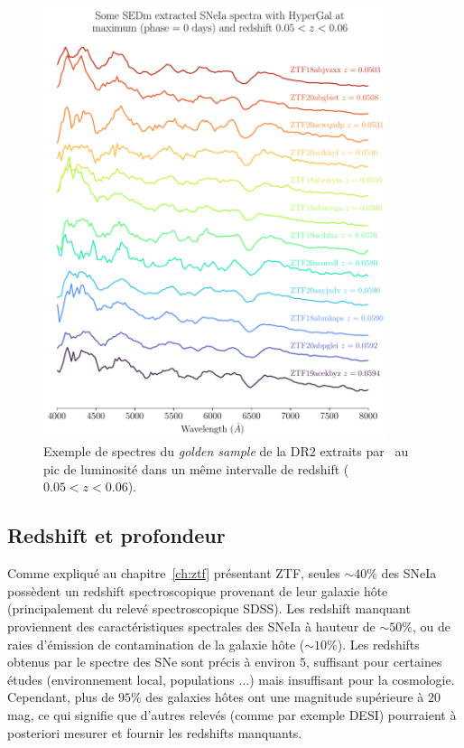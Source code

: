 \documentclass[../main/main.tex]{subfiles}
\begin{document}
\begin{figure}[ht]
  \centering
  \includegraphics[width=0.9\textwidth]{../figures/09_dr2/spec_example_hypergaldr2.pdf}
  \caption[Exemple de spectres du \textit{golden sample} de la DR2
  extraits par \hypergal.]{Exemple de spectres du \textit{golden sample} de la DR2
  extraits par \hypergal\ au pic de luminosité dans un même intervalle
  de redshift ($0.05<z<0.06$).}
  \label{fig:specexamplehypergal}
\end{figure}



\subsection{Redshift et profondeur}


Comme expliqué au chapitre~\ref{ch:ztf} présentant ZTF, seules
$\sim40\%$ des SNeIa possèdent un redshift spectroscopique provenant de
leur galaxie hôte (principalement du relevé spectroscopique SDSS). Les
redshift manquant proviennent des caractéristiques spectrales des SNeIa
à hauteur de $\sim50\%$, ou de raies d'émission de contamination de la
galaxie hôte ($\sim10\%$). Les redshifts obtenus par le
spectre des SNe sont précis à environ $5$\textperthousand, suffisant pour
certaines études (environnement local, populations ...) mais insuffisant
pour la cosmologie. Cependant, plus de $95\%$ des galaxies hôtes ont une
magnitude supérieure à $20$ mag, ce qui signifie que d'autres relevés (comme par
exemple DESI) pourraient à posteriori mesurer et fournir les redshifts
manquants.
\end{document}

